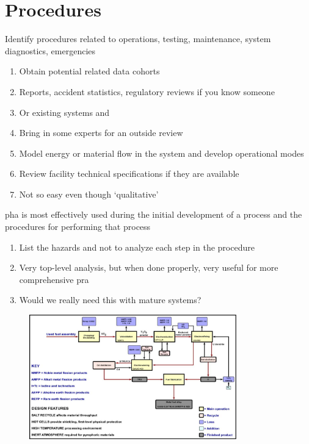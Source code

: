 \documentclass[aspectratio=1610,pdftex,dvipsnames,compress,xcolor={dvipsnames}]{beamer}
\newcommand{\acs}{\acrshort} %
\newcommand{\acsp}{\acrshortpl} %
\begin{document}
\section{Procedures}


\addtocounter{framenumber}{-1}
\begin{frame}{Identify procedures related to operations, testing, maintenance, system diagnostics, emergencies}
    \begin{enumerate}[series=outerlist,topsep=0pt,itemsep=11pt,leftmargin=*,label=(\arabic*)]
        \item[]Obtain potential related data cohorts  
        \item[]Reports, accident statistics, regulatory reviews if you know someone  
        \item[]Or existing systems and \acsp{pha}
        \item[]Bring in some experts for an outside review
        \item[]Model energy or material flow in the system and develop operational modes  
        \item[]Review facility technical specifications if they are available  
        \item[]Not so easy even though `qualitative'
    \end{enumerate}
\end{frame}


\begin{frame}{\acs{pha} is most effectively used during the initial development of a process and the procedures for performing that process}
    \begin{enumerate}[series=outerlist,topsep=0pt,itemsep=21pt,leftmargin=*,label=(\arabic*)]
        \item[]List the hazards and not to analyze each step in the procedure  
        \item[]Very top-level analysis, but when done properly, very useful for more comprehensive \acs{pra}
        \item[]Would we really need this with mature systems?
    \end{enumerate}
\end{frame}


\begin{frame}{}
    \begin{figure}
        \centering
        \includegraphics[width=0.80\textwidth]{pyroprocessing.flowsheet.jpg}
    \end{figure}
\end{frame}
\end{document}
